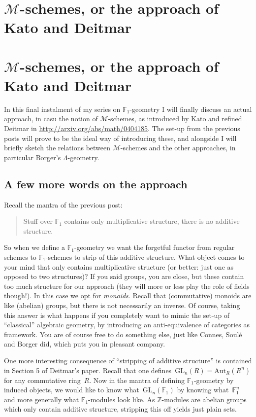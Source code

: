 \iftex
\section{\texorpdfstring{$\mathcal{M}$}{M}-schemes, or the approach of Kato and Deitmar}
\fi
\ifblog
\section{$\mathcal{M}$-schemes, or the approach of Kato and Deitmar}
\fi

In this final instalment of my series on $\mathbb{F}_1$-geometry I will finally discuss an actual approach, in casu the notion of $\mathcal{M}$-schemes, as introduced by Kato and refined Deitmar in \url{http://arxiv.org/abs/math/0404185}. The set-up from the previous posts will prove to be the ideal way of introducing these, and alongside I will briefly sketch the relations between $\mathcal{M}$-schemes and the other approaches, in particular Borger's $\Lambda$-geometry.

\subsection{A few more words on the approach}
Recall the mantra of the previous post:
\begin{quote}
  Stuff over $\mathbb{F}_1$ contains only multiplicative structure, there is no additive structure.
\end{quote}
So when we define a $\mathbb{F}_1$-geometry we want the forgetful functor from regular schemes to $\mathbb{F}_1$-schemes to strip of this additive structure. What object comes to your mind that only contains multiplicative structure (or better: just one as opposed to two structures)? If you said groups, you are close, but these contain too much structure for our approach (they will more or less play the role of fields though!). In this case we opt for \emph{monoids}. Recall that (commutative) monoids are like (abelian) groups, but there is not necessarily an inverse. Of course, taking this answer is what happens if you completely want to mimic the set-up of ``classical'' algebraic geometry, by introducing an anti-equivalence of categories as framework. You are of course free to do something else, just like Connes, Soul\'e and Borger did, which puts you in pleasant company.

One more interesting consequence of ``stripping of additive structure'' is contained in Section 5 of Deitmar's paper. Recall that one defines~$\mathrm{GL}_n(R)=\mathrm{Aut}_R(R^n)$ for any commutative ring~$R$. Now in the mantra of defining $\mathbb{F}_1$-geometry by induced objects, we would like to know what~$\mathrm{GL}_n(\mathbb{F}_1)$ by knowing what~$\mathbb{F}_1^n$ and more generally what $\mathbb{F}_1$-modules look like. As $\mathbb{Z}$-modules are abelian groups which only contain additive structure, stripping this off yields just plain sets.


